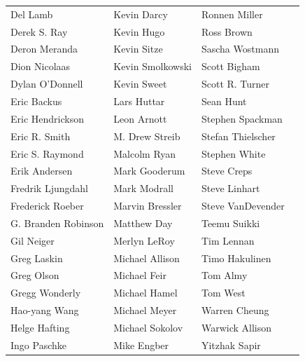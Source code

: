 \documentclass[titlepage]{article}
\begin{document}
\begin{center}
\begin{tabular}{llll}
Del Lamb & Kevin Darcy & Ronnen Miller\\
Derek S. Ray & Kevin Hugo & Ross Brown\\
Deron Meranda & Kevin Sitze & Sascha Wostmann\\
Dion Nicolaas & Kevin Smolkowski & Scott Bigham\\
Dylan O'Donnell & Kevin Sweet & Scott R. Turner\\
Eric Backus & Lars Huttar & Sean Hunt\\
Eric Hendrickson & Leon Arnott & Stephen Spackman\\
Eric R. Smith & M. Drew Streib & Stefan Thielscher\\
Eric S. Raymond & Malcolm Ryan & Stephen White\\
Erik Andersen & Mark Gooderum & Steve Creps\\
Fredrik Ljungdahl & Mark Modrall & Steve Linhart\\
Frederick Roeber & Marvin Bressler & Steve VanDevender\\
G. Branden Robinson & Matthew Day & Teemu Suikki\\
Gil Neiger & Merlyn LeRoy & Tim Lennan\\
Greg Laskin & Michael Allison & Timo Hakulinen\\
Greg Olson & Michael Feir & Tom Almy\\
Gregg Wonderly & Michael Hamel & Tom West\\
Hao-yang Wang & Michael Meyer & Warren Cheung\\
Helge Hafting & Michael Sokolov & Warwick Allison\\
Ingo Paschke & Mike Engber & Yitzhak Sapir
\end{tabular}
\end{center}
\clearpage
\end{document}
